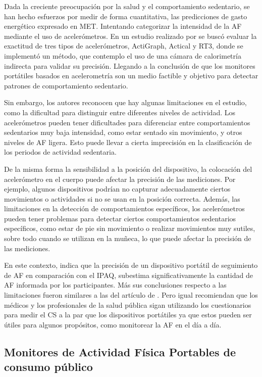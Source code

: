 Dada la creciente preocupación por la salud y el comportamiento sedentario, se han hecho esfuerzos por medir de forma cuantitativa, las predicciones de gasto energético expresado en MET. Intentando categorizar la intensidad de la AF mediante el uso de acelerómetros. En un estudio realizado por \citet{Rothney2008Validity} se buscó evaluar la exactitud de tres tipos de acelerómetros, ActiGraph, Actical y RT3, donde se implementó un método, que contemplo el uso de una cámara de calorimetría indirecta para validar su precisión. Llegando a la conclusión de que los monitores portátiles basados en acelerometría son un medio factible y objetivo para detectar patrones de comportamiento sedentario.

Sin embargo, los autores reconocen que hay algunas limitaciones en el estudio, como la dificultad para distinguir entre diferentes niveles de actividad. Los acelerómetros pueden tener dificultades para diferenciar entre comportamientos sedentarios muy baja intensidad, como estar sentado sin movimiento, y otros niveles de AF ligera. Esto puede llevar a cierta imprecisión en la clasificación de los periodos de actividad sedentaria.

De la misma forma la sensibilidad a la posición del dispositivo, la colocación del acelerómetro en el cuerpo puede afectar la precisión de las mediciones. Por ejemplo, algunos dispositivos podrían no capturar adecuadamente ciertos movimientos o actividades si no se usan en la posición correcta. Además, las limitaciones en la detección de comportamientos específicos, los acelerómetros pueden tener problemas para detectar ciertos comportamientos sedentarios específicos, como estar de pie sin movimiento o realizar movimientos muy sutiles, sobre todo cuando se utilizan en la muñeca, lo que puede afectar la precisión de las mediciones.

En este contexto, \citet{Henriksen2018} indica que la precisión de un dispositivo portátil de seguimiento de AF en comparación con el IPAQ, subestima significativamente la cantidad de AF informada por los participantes. Más sus conclusiones respecto a las limitaciones fueron similares a las del artículo de \citet{Rothney2008Validity}. Pero igual recomiendan que los médicos y los profesionales de la salud pública sigan utilizando los cuestionarios para medir el CS a la par que los dispositivos portátiles ya que estos pueden ser útiles para algunos propósitos, como monitorear la AF en el día a día.

\subsection{Monitores de Actividad Física Portables de consumo público}
\label{subsec:monitores_af_consumo_publico}

